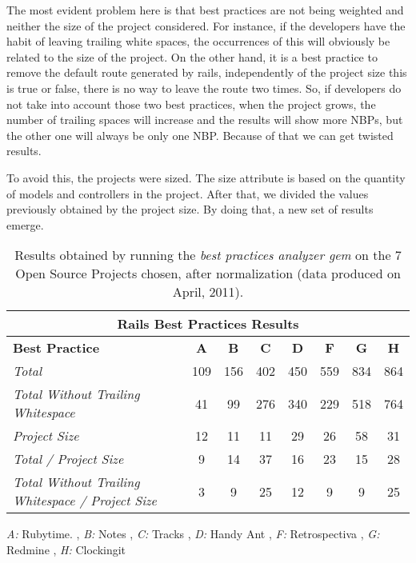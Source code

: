 The most evident problem here is that best practices are not being weighted and neither the size of the project considered.
For instance, if the developers have the habit of leaving trailing white spaces, 
the occurrences of this will obviously be related to the size of the project.
On the other hand, it is a best practice to remove the default route generated by rails, 
independently of the project size this is true or false, there is no way to leave the route two times. 
So, if developers do not take into account those two best practices, when the project grows, 
the number of trailing spaces will increase and the results will show more NBPs, 
but the other one will always be only one NBP.  
Because of that we can get twisted results.

To avoid this, the projects were sized.
The size attribute is based on the quantity of models and controllers in the project.
After that, we divided the values previously obtained  by the project size.
By doing that, a new set of results emerge.

\begin{table}[H]
\begin{center}
{\scriptsize
\begin{threeparttable}
\begin{tabular}{|l||c|c|c|c|c|c|c|} \hline
\multicolumn{8}{|c|}{Rails Best Practices Results} \\ \hline
\textbf{Best Practice}& \textbf{A}& \textbf{B}& \textbf{C}&  \textbf{D}& \textbf{F}& \textbf{G}& \textbf{H} \\\hline\hline
\emph{Total                                           }              & 109  & 156  & 402  & 450 & 559 & 834 & 864  \\ \hline
\emph{Total Without Trailing Whitespace               }              &  41  &  99  & 276  & 340 & 229 & 518 & 764  \\ \hline
\emph{Project Size                                    }              &  12  &  11  &  11  &  29 &  26 &  58 &  31  \\ \hline
\emph{Total / Project Size                            }              &   9  &  14  &  37  &  16 &  23 &  15 &  28  \\ \hline
\emph{Total Without Trailing Whitespace / Project Size}              &   3  &   9  &  25  &  12 &   9 &   9 &  25  \\ \hline
\end{tabular}
\begin{tablenotes}
  \item \emph{A:} Rubytime.
  , \emph{B:} Notes
  , \emph{C:} Tracks
  , \emph{D:} Handy Ant
  , \emph{F:} Retrospectiva
  , \emph{G:} Redmine
  , \emph{H:} Clockingit
\end{tablenotes}
\end{threeparttable}
}
\end{center}
\caption{Results obtained by running the \emph{best practices analyzer gem} on the 7 Open Source Projects chosen, after normalization (data produced on April, 2011).}
\end{table}

